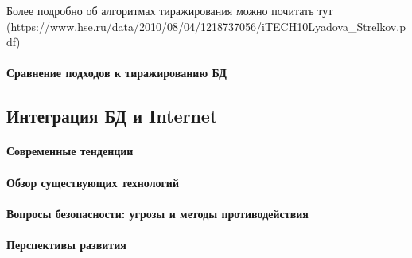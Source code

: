 Более подробно об алгоритмах тиражирования можно почитать тут (https://www.hse.ru/data/2010/08/04/1218737056/iTECH10\-Lyadova\_Strelkov.pdf)
\paragraph{Сравнение подходов к тиражированию БД}

\subsection{Интеграция БД и Internet}
\paragraph{Современные тенденции}
\paragraph{Обзор существующих технологий}
\paragraph{Вопросы безопасности: угрозы и методы противодействия}
\paragraph{Перспективы развития}